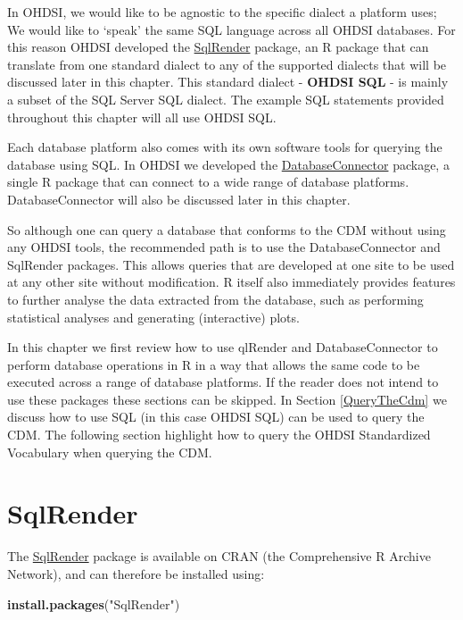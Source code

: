 \documentclass[11pt]{book}
\newenvironment{Shaded}{\begin{snugshade}}{\end{snugshade}}
\newcommand{\KeywordTok}[1]{\textcolor[rgb]{0.13,0.29,0.53}{\textbf{#1}}}
\newcommand{\StringTok}[1]{\textcolor[rgb]{0.31,0.60,0.02}{#1}}
\newcommand{\NormalTok}[1]{#1}
\begin{document}
In OHDSI, we would like to be agnostic to the specific dialect a
platform uses; We would like to `speak' the same SQL language across all
OHDSI databases. For this reason OHDSI developed the
\href{https://ohdsi.github.io/SqlRender/}{SqlRender} package, an R
package that can translate from one standard dialect to any of the
supported dialects that will be discussed later in this chapter. This
standard dialect - \textbf{OHDSI SQL} - is mainly a subset of the SQL
Server SQL dialect. The example SQL statements provided throughout this
chapter will all use OHDSI SQL.

Each database platform also comes with its own software tools for
querying the database using SQL. In OHDSI we developed the
\href{https://ohdsi.github.io/DatabaseConnector/}{DatabaseConnector}
package, a single R package that can connect to a wide range of database
platforms. DatabaseConnector will also be discussed later in this
chapter.

So although one can query a database that conforms to the CDM without
using any OHDSI tools, the recommended path is to use the
DatabaseConnector and SqlRender packages. This allows queries that are
developed at one site to be used at any other site without modification.
R itself also immediately provides features to further analyse the data
extracted from the database, such as performing statistical analyses and
generating (interactive) plots.

In this chapter we first review how to use qlRender and
DatabaseConnector to perform database operations in R in a way that
allows the same code to be executed across a range of database
platforms. If the reader does not intend to use these packages these
sections can be skipped. In Section \ref{QueryTheCdm} we discuss how to
use SQL (in this case OHDSI SQL) can be used to query the CDM. The
following section highlight how to query the OHDSI Standardized
Vocabulary when querying the CDM.

\section{SqlRender}\label{SqlRender}

The \href{https://ohdsi.github.io/SqlRender/}{SqlRender} package is
available on CRAN (the Comprehensive R Archive Network), and can
therefore be installed using:

\begin{Shaded}
\begin{Highlighting}[]
\KeywordTok{install.packages}\NormalTok{(}\StringTok{"SqlRender"}\NormalTok{)}
\end{Highlighting}
\end{Shaded}
\end{document}
